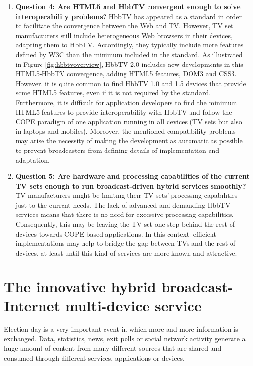 \begin{enumerate}
	\item \textbf{Question 4: Are HTML5 and HbbTV convergent enough to solve interoperability problems?} HbbTV has appeared as a standard in order to facilitate the convergence between the Web and TV. However, TV set manufacturers still include heterogeneous Web browsers in their devices, adapting them to HbbTV. Accordingly, they typically include more features defined by W3C than the minimum included in the standard. As illustrated in Figure \ref{fig:hbbtvoverview}, HbbTV 2.0 includes new developments in this HTML5-HbbTV convergence, adding HTML5 features, DOM3 and CSS3. However, it is quite common to find HbbTV 1.0 and 1.5 devices that provide some HTML5 features, even if it is not required by the standard. Furthermore, it is difficult for application developers to find the minimum HTML5 features to provide interoperability with HbbTV and follow the COPE paradigm of one application running in all devices (TV sets but also in laptops and mobiles). Moreover, the mentioned compatibility problems may arise the necessity of making the development as automatic as possible to prevent broadcasters from defining details of implementation and adaptation. 
	\item \textbf{Question 5: Are hardware and processing capabilities of the current TV sets enough to run broadcast-driven hybrid services smoothly?} TV manufacturers might be limiting their TV sets' processing capabilities just to the current needs. The lack of advanced and demanding HbbTV services means that there is no need for excessive processing capabilities. Consequently, this may be leaving the TV set one step behind the rest of devices towards COPE based applications. In this context, efficient implementations may help to bridge the gap between TVs and the rest of devices, at least until this kind of services are more known and attractive. 
	
\end{enumerate}

\section{The innovative hybrid broadcast-Internet multi-device service}\label{usecase}

Election day is a very important event in which more and more information is exchanged. Data, statistics, news, exit polls or social network activity generate a huge amount of content from many different sources that are shared and consumed through different services, applications or devices. 


